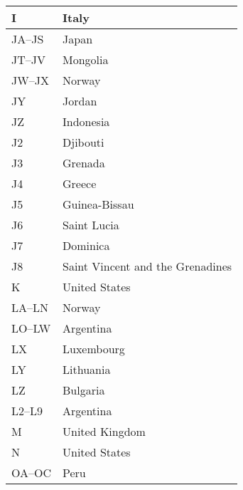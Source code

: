 \begin{longtable}{|l|l|}
  I                   & Italy                                     \\
  \hline
  JA--JS              & Japan                                     \\
  \hline
  JT--JV              & Mongolia                                  \\
  \hline
  JW--JX              & Norway                                    \\
  \hline
  JY                  & Jordan                                    \\
  \hline
  JZ                  & Indonesia                                 \\
  \hline
  J2                  & Djibouti                                  \\
  \hline
  J3                  & Grenada                                   \\
  \hline
  J4                  & Greece                                    \\
  \hline
  J5                  & Guinea-Bissau                             \\
  \hline
  J6                  & Saint Lucia                               \\
  \hline
  J7                  & Dominica                                  \\
  \hline
  J8                  & Saint Vincent and the Grenadines          \\
  \hline
  K                   & United States                             \\
  \hline
  LA--LN              & Norway                                    \\
  \hline
  LO--LW              & Argentina                                 \\
  \hline
  LX                  & Luxembourg                                \\
  \hline
  LY                  & Lithuania                                 \\
  \hline
  LZ                  & Bulgaria                                  \\
  \hline
  L2--L9              & Argentina                                 \\
  \hline
  M                   & United Kingdom                            \\
  \hline
  N                   & United States                             \\
  \hline
  OA--OC              & Peru                                      \\

\end{longtable}
